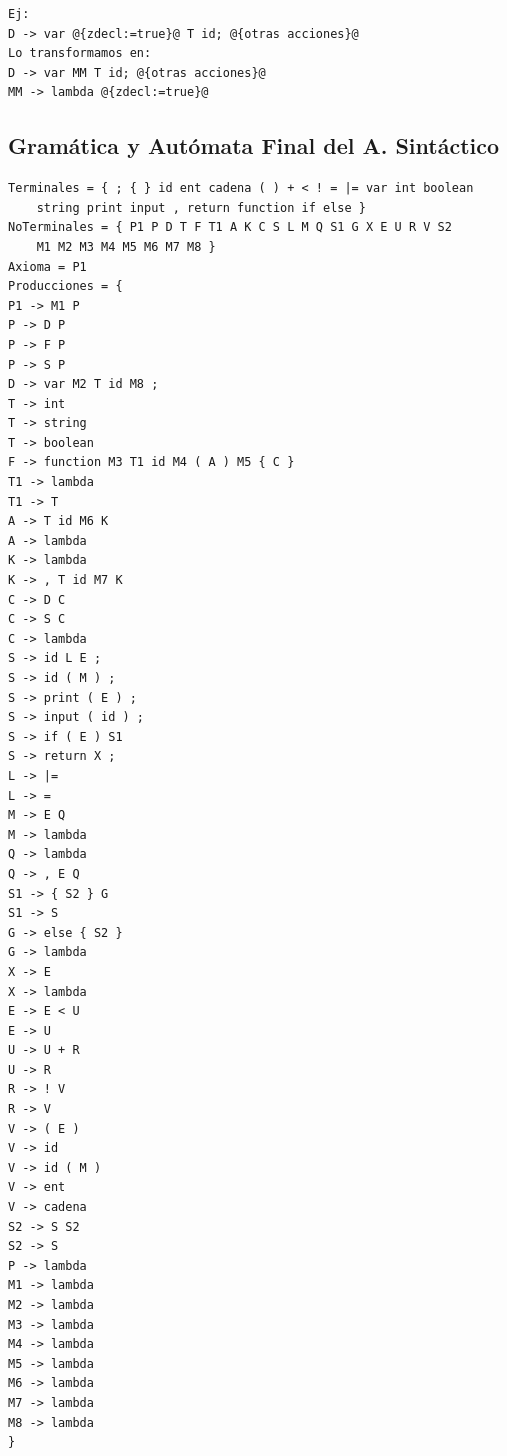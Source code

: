 \documentclass[a4paper, 12pt]{article}
\begin{document}
\begin{lstlisting}[style=EdT]
Ej:
D -> var @{zdecl:=true}@ T id; @{otras acciones}@
Lo transformamos en:
D -> var MM T id; @{otras acciones}@
MM -> lambda @{zdecl:=true}@
\end{lstlisting}

\subsection{Gramática y Autómata Final del A. Sintáctico}
\begin{lstlisting}[style=Gramatica]
Terminales = { ; { } id ent cadena ( ) + < ! = |= var int boolean 
	string print input , return function if else }
NoTerminales = { P1 P D T F T1 A K C S L M Q S1 G X E U R V S2 
	M1 M2 M3 M4 M5 M6 M7 M8 }
Axioma = P1
Producciones = {
P1 -> M1 P
P -> D P
P -> F P
P -> S P
D -> var M2 T id M8 ;
T -> int
T -> string
T -> boolean
F -> function M3 T1 id M4 ( A ) M5 { C }
T1 -> lambda
T1 -> T
A -> T id M6 K
A -> lambda
K -> lambda
K -> , T id M7 K
C -> D C
C -> S C
C -> lambda
S -> id L E ;
S -> id ( M ) ;
S -> print ( E ) ;
S -> input ( id ) ;
S -> if ( E ) S1
S -> return X ;
L -> |=
L -> =
M -> E Q
M -> lambda
Q -> lambda
Q -> , E Q
S1 -> { S2 } G
S1 -> S
G -> else { S2 }
G -> lambda
X -> E
X -> lambda
E -> E < U
E -> U
U -> U + R
U -> R
R -> ! V
R -> V
V -> ( E )
V -> id
V -> id ( M )
V -> ent
V -> cadena
S2 -> S S2
S2 -> S
P -> lambda
M1 -> lambda
M2 -> lambda
M3 -> lambda
M4 -> lambda
M5 -> lambda
M6 -> lambda
M7 -> lambda
M8 -> lambda
}
\end{lstlisting}
\end{document}
